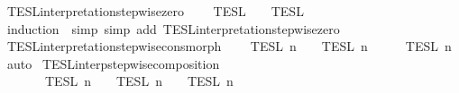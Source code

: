 \begin{isabellebody}
\ TESL{\isacharunderscore}interpretation{\isacharunderscore}stepwise{\isacharunderscore}zero{\isacharprime}{\isacharcolon}\isanewline
\ \ {\isacartoucheopen}{\isasymlbrakk}{\isasymlbrakk}\ {\isasymPhi}\ {\isasymrbrakk}{\isasymrbrakk}\isactrlsub T\isactrlsub E\isactrlsub S\isactrlsub L\ {\isacharequal}\ {\isasymlbrakk}{\isasymlbrakk}\ {\isasymPhi}\ {\isasymrbrakk}{\isasymrbrakk}\isactrlsub T\isactrlsub E\isactrlsub S\isactrlsub L\isactrlbsup {\isasymge}\ {}\isactrlesup {\isacartoucheclose}\isanewline
%
\isadelimproof
%
\endisadelimproof
%
\isatagproof
{}\isamarkupfalse%
\ {\isacharparenleft}induction\ {\isasymPhi}{\isacharcomma}\ simp{\isacharcomma}\ simp\ add{\isacharcolon}\ TESL{\isacharunderscore}interpretation{\isacharunderscore}stepwise{\isacharunderscore}zero{\isacharparenright}%
\endisatagproof
{\isafoldproof}%
%
\isadelimproof
\isanewline
%
\endisadelimproof
\isanewline
{}\isamarkupfalse%
\ TESL{\isacharunderscore}interpretation{\isacharunderscore}stepwise{\isacharunderscore}cons{\isacharunderscore}morph{\isacharcolon}\isanewline
\ \ {\isacartoucheopen}{\isasymlbrakk}\ {\isasymphi}\ {\isasymrbrakk}\isactrlsub T\isactrlsub E\isactrlsub S\isactrlsub L\isactrlbsup {\isasymge}\ n\isactrlesup \ {\isasyminter}\ {\isasymlbrakk}{\isasymlbrakk}\ {\isasymPhi}\ {\isasymrbrakk}{\isasymrbrakk}\isactrlsub T\isactrlsub E\isactrlsub S\isactrlsub L\isactrlbsup {\isasymge}\ n\isactrlesup \ {\isacharequal}\ {\isasymlbrakk}{\isasymlbrakk}\ {\isasymphi}\ {\isacharhash}\ {\isasymPhi}\ {\isasymrbrakk}{\isasymrbrakk}\isactrlsub T\isactrlsub E\isactrlsub S\isactrlsub L\isactrlbsup {\isasymge}\ n\isactrlesup {\isacartoucheclose}\isanewline
%
\isadelimproof
%
\endisadelimproof
%
\isatagproof
{}\isamarkupfalse%
\ auto%
\endisatagproof
{\isafoldproof}%
%
\isadelimproof
\isanewline
%
\endisadelimproof
\isanewline
{}\isamarkupfalse%
\ TESL{\isacharunderscore}interp{\isacharunderscore}stepwise{\isacharunderscore}composition{\isacharcolon}\isanewline
\ \ \ {\isacartoucheopen}{\isasymlbrakk}{\isasymlbrakk}\ {\isasymPhi}\ {\isacharat}\ {\isasymPhi}\ {\isasymrbrakk}{\isasymrbrakk}\isactrlsub T\isactrlsub E\isactrlsub S\isactrlsub L\isactrlbsup {\isasymge}\ n\isactrlesup \ {\isacharequal}\ {\isasymlbrakk}{\isasymlbrakk}\ {\isasymPhi}\ {\isasymrbrakk}{\isasymrbrakk}\isactrlsub T\isactrlsub E\isactrlsub S\isactrlsub L\isactrlbsup {\isasymge}\ n\isactrlesup \ {\isasyminter}\ {\isasymlbrakk}{\isasymlbrakk}\ {\isasymPhi}\ {\isasymrbrakk}{\isasymrbrakk}\isactrlsub T\isactrlsub E\isactrlsub S\isactrlsub L\isactrlbsup {\isasymge}\ n\isactrlesup {\isacartoucheclose}\isanewline

\end{isabellebody}
